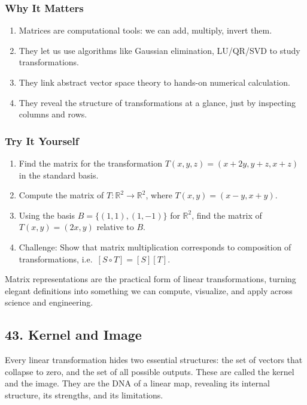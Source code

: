 \documentclass[
  letterpaper,
  DIV=11,
  numbers=noendperiod]{scrreprt}
\providecommand{\tightlist}{%
  \setlength{\itemsep}{0pt}\setlength{\parskip}{0pt}}
\begin{document}
\subsubsection{Why It Matters}\label{why-it-matters-38}

\begin{enumerate}
\def\labelenumi{\arabic{enumi}.}
\tightlist
\item
  Matrices are computational tools: we can add, multiply, invert them.
\item
  They let us use algorithms like Gaussian elimination, LU/QR/SVD to
  study transformations.
\item
  They link abstract vector space theory to hands-on numerical
  calculation.
\item
  They reveal the structure of transformations at a glance, just by
  inspecting columns and rows.
\end{enumerate}

\subsubsection{Try It Yourself}\label{try-it-yourself-41}

\begin{enumerate}
\def\labelenumi{\arabic{enumi}.}
\tightlist
\item
  Find the matrix for the transformation \(T(x,y,z) = (x+2y, y+z, x+z)\)
  in the standard basis.
\item
  Compute the matrix of \(T: \mathbb{R}^2 \to \mathbb{R}^2\), where
  \(T(x,y) = (x-y, x+y)\).
\item
  Using the basis \(B=\{(1,1), (1,-1)\}\) for \(\mathbb{R}^2\), find the
  matrix of \(T(x,y) = (2x, y)\) relative to \(B\).
\item
  Challenge: Show that matrix multiplication corresponds to composition
  of transformations, i.e.~\([S \circ T] = [S][T]\).
\end{enumerate}

Matrix representations are the practical form of linear transformations,
turning elegant definitions into something we can compute, visualize,
and apply across science and engineering.

\subsection{43. Kernel and Image}\label{kernel-and-image}

Every linear transformation hides two essential structures: the set of
vectors that collapse to zero, and the set of all possible outputs.
These are called the kernel and the image. They are the DNA of a linear
map, revealing its internal structure, its strengths, and its
limitations.
\end{document}
